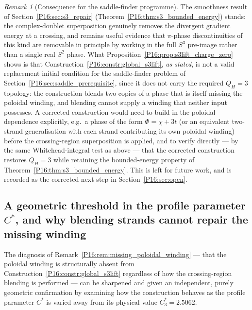 \documentclass[11pt,a4paper]{article}
\theoremstyle{definition}\newtheorem{definition}[theorem]{Definition}
\theoremstyle{remark}
\newtheorem{remark}[theorem]{Remark}
\theoremstyle{definition}\newtheorem{construction}[theorem]{Construction}
\newcommand{\QH}{Q_H}
\begin{document}
\begin{remark}[Consequence for the saddle-finder programme]
\label{P16:rem:s3lift_not_sufficient}
The smoothness result of Section~\ref{P16:sec:s3_repair}
(Theorem~\ref{P16:thm:s3_bounded_energy}) stands: the complex-doublet
superposition genuinely removes the divergent gradient energy at a
crossing, and remains useful evidence that $\pi$-phase
discontinuities of this kind are removable in principle by working
in the full $S^3$ pre-image rather than a single real $S^2$ phase.
What Proposition~\ref{P16:prop:s3lift_charge_zero} shows is that
Construction~\ref{P16:constr:global_s3lift}, \emph{as stated}, is not a
valid replacement initial condition for the saddle-finder problem of
Section~\ref{P16:sec:saddle_prerequisite}, since it does not carry the
required $\QH=3$ topology: the construction blends two copies of a
phase that is itself missing the poloidal winding, and blending
cannot supply a winding that neither input possesses. A corrected
construction would need to build in the poloidal dependence
explicitly, e.g.\ a phase of the form $\Phi=\chi+3t$ (or an
equivalent two-strand generalisation with each strand contributing
its own poloidal winding) before the crossing-region superposition is
applied, and to verify directly --- by the same Whitehead-integral
test as above --- that the corrected construction restores $\QH=3$
while retaining the bounded-energy property of
Theorem~\ref{P16:thm:s3_bounded_energy}. This is left for future work,
and is recorded as the corrected next step in
Section~\ref{P16:sec:open}.
\end{remark}

\subsection{A geometric threshold in the profile parameter $C^*$, and
  why blending strands cannot repair the missing winding}
\label{P16:sec:cstar_threshold}

The diagnosis of Remark~\ref{P16:rem:missing_poloidal_winding} --- that
the poloidal winding is structurally absent from
Construction~\ref{P16:constr:global_s3lift} regardless of how the
crossing-region blending is performed --- can be sharpened and given
an independent, purely geometric confirmation by examining how the
construction behaves as the profile parameter $C^*$ is varied away
from its physical value $C_3^*=2.5062$.
\end{document}
